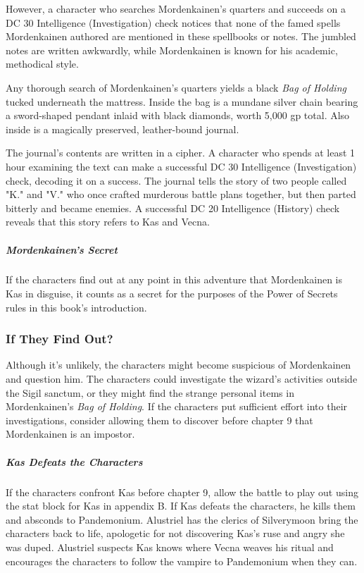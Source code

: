 \documentclass[10pt,a4paper,twoside,bg=print,twocolumn,openany,nodeprecatedcode]{dndbook}
\begin{document}
However, a character who searches Mordenkainen's quarters and succeeds on a DC 30 Intelligence (Investigation) check notices that none of the famed spells Mordenkainen authored are mentioned in these spellbooks or notes. The jumbled notes are written awkwardly, while Mordenkainen is known for his academic, methodical style.

Any thorough search of Mordenkainen's quarters yields a black \textit{Bag of Holding} tucked underneath the mattress. Inside the bag is a mundane silver chain bearing a sword-shaped pendant inlaid with black diamonds, worth 5,000 gp total. Also inside is a magically preserved, leather-bound journal.

The journal's contents are written in a cipher. A character who spends at least 1 hour examining the text can make a successful DC 30 Intelligence (Investigation) check, decoding it on a success. The journal tells the story of two people called "K." and "V." who once crafted murderous battle plans together, but then parted bitterly and became enemies. A successful DC 20 Intelligence (History) check reveals that this story refers to Kas and Vecna.

\subparagraph{Mordenkainen's Secret}
If the characters find out at any point in this adventure that Mordenkainen is Kas in disguise, it counts as a secret for the purposes of the Power of Secrets rules in this book's introduction.

\subsubsection{If They Find Out?}
Although it's unlikely, the characters might become suspicious of Mordenkainen and question him. The characters could investigate the wizard's activities outside the Sigil sanctum, or they might find the strange personal items in Mordenkainen's \textit{Bag of Holding}. If the characters put sufficient effort into their investigations, consider allowing them to discover before chapter 9 that Mordenkainen is an impostor.

\subparagraph{Kas Defeats the Characters}
If the characters confront Kas before chapter 9, allow the battle to play out using the stat block for Kas in appendix B. If Kas defeats the characters, he kills them and absconds to Pandemonium. Alustriel has the clerics of Silverymoon bring the characters back to life, apologetic for not discovering Kas's ruse and angry she was duped. Alustriel suspects Kas knows where Vecna weaves his ritual and encourages the characters to follow the vampire to Pandemonium when they can.
\end{document}
